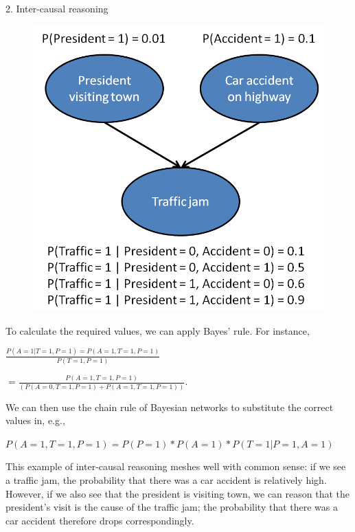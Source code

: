 \documentclass{book}
\begin{document}
2. Inter-causal reasoning

\begin{figure}[h]
\centering
\includegraphics[width=0.7\linewidth]{figures/bayesian_ex1}
\caption{}
\label{fig:bayesianex1}
\end{figure}

To calculate the required values, we can apply Bayes' rule. For instance,

$\frac{P(A=1|T=1,P=1)=P(A=1,T=1,P=1)}{P(T=1,P=1)}$

$=\frac{P(A=1,T=1,P=1)}{(P(A=0,T=1,P=1)+P(A=1,T=1,P=1))}$.

We can then use the chain rule of Bayesian networks to substitute the correct values in, e.g.,

$P(A=1,T=1,P=1)=P(P=1)*P(A=1)*P(T=1|P=1,A=1)$

This example of inter-causal reasoning meshes well with common sense: if we see a traffic jam, the probability that there was a car accident is relatively high. However, if we also see that the president is visiting town, we can reason that the president's visit is the cause of the traffic jam; the probability that there was a car accident therefore drops correspondingly.






 
\end{document}
